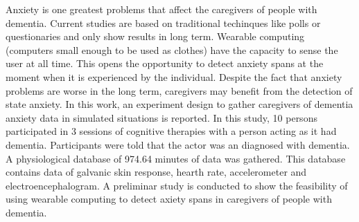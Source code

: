 Anxiety is one greatest problems that affect the caregivers of people with dementia. Current studies are based on traditional techinques like polls or questionaries and only show results in long term. Wearable computing (computers small enough to be used as clothes) have the capacity to sense the user at all time. This opens the opportunity to detect anxiety spans at the moment when it is experienced by the individual. Despite the fact that anxiety problems are worse in the long term, caregivers may benefit from the detection of state anxiety. In this work, an experiment design to gather caregivers of dementia anxiety data in simulated situations is reported. In this study, 10 persons participated in 3 sessions of cognitive therapies with a person acting as it had dementia. Participants were told that the actor was an diagnosed with dementia. A physiological database of 974.64 minutes of data was gathered. This database contains data of galvanic skin response, hearth rate, accelerometer and electroencephalogram. A preliminar study is conducted to show the feasibility of using wearable computing to detect axiety spans in caregivers of people with dementia.
